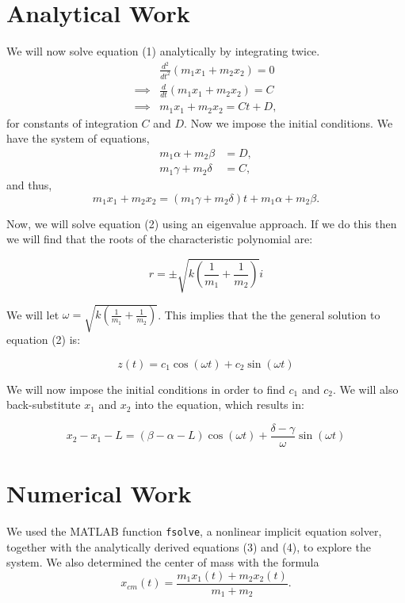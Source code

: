 \documentclass[11pt, oneside]{article}   	%
\begin{document}
\section{Analytical Work}
We will now solve equation (1) analytically by integrating twice.
\begin{align*}
&\frac{d^2}{dt^2}(m_1x_1 + m_2x_2) = 0 \\
\implies & \frac{d}{dt}(m_1x_1 + m_2x_2) = C\\
\implies & m_1x_1 + m_2x_2 = Ct+D,
\end{align*}
for constants of integration $C$ and $D$. Now we impose the initial conditions.
We have the system of equations,
\begin{align*}
m_1\alpha + m_2\beta &= D, \\
m_1\gamma + m_2\delta &= C,
\end{align*}
and thus,
\begin{equation}
m_1x_1 + m_2x_2 = (m_1\gamma + m_2\delta)t + m_1\alpha + m_2\beta.
\end{equation}

Now, we will solve equation (2) using an eigenvalue approach.
If we do this then we will find that the roots of the characteristic polynomial are:

$$r = \pm \sqrt{k\left(\frac{1}{m_1}+\frac{1}{m_2}\right)}i$$

We will let $\displaystyle{\omega = \sqrt{k\left(\frac{1}{m_1}+\frac{1}{m_2}\right)}}$. This implies that the the general solution to equation (2) is:

$$z(t) = c_1\cos{(\omega t)}+c_2\sin{(\omega t)}$$

We will now impose the initial conditions in order to find $c_1$ and $c_2$.
We will also back-substitute $x_1$ and $x_2$ into the equation, which results in:

\begin{equation}
x_2-x_1-L = \left(\beta - \alpha - L\right)\cos{\left(\omega t\right)}+\frac{\delta - \gamma}{\omega}\sin{(\omega t)}
\end{equation}

\section{Numerical Work}
We used the MATLAB function \texttt{fsolve}, a nonlinear implicit equation solver, together with the analytically derived equations (3) and (4), to explore the system.
We also determined the center of mass with the formula
$$
x_{cm}(t) = \frac{m_1x_1(t) + m_2x_2(t)}{m_1 + m_2}.
$$
\end{document}
